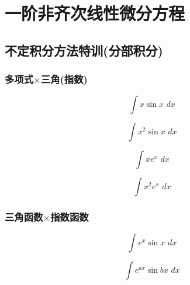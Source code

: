 \documentclass[lang=cn,14pt]{elegantbook}
\begin{document}
	\section{一阶非齐次线性微分方程}
	\subsection{不定积分方法特训(分部积分)}
	\subsubsection{多项式$\times$三角(指数)}
	\begin{example}
		\begin{equation*}
			\int{x\sin x\,\,dx}
		\end{equation*}
	\end{example}
	\vspace{2cm}
	\begin{example}
		\begin{equation*}
			\int{x^{2}\sin x\,\,dx}
		\end{equation*}
	\end{example}
	\vspace{2cm}
	\begin{example}
		\begin{equation*}
			\int{xe^x\,\,dx}
		\end{equation*}
	\end{example}
	\vspace{2cm}
	\begin{example}
		\begin{equation*}
			\int{x^{2}e^x\,\,dx}
		\end{equation*}
	\end{example}
	\vspace{2cm}
	\subsubsection{三角函数$\times$指数函数}
	\begin{example}
		\begin{equation*}
			\int{e^x\sin x\,\,dx}
		\end{equation*}
	\end{example}
	\vspace{2cm}
	\begin{example}
		\begin{equation*}
			\int{e^{ax}\sin bx\,\,dx}
		\end{equation*}
	\end{example}
	\vspace{2cm}
\end{document}
